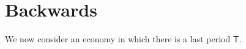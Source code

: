 \documentclass[../BufferStockTheory.tex]{subfiles}\usepackage{ApndxSteadyState}
\begin{document}
  

  \begin{comment}

    \begin{equation}\begin{gathered}\begin{aligned}
           & = \left(\frac{1}{2}\right)\left(\erf(\Top{\SetSub}_{\this}-\Bot{\SetSub}_{\this})-\erf(\Bot{\SetSub}_{\this}-\Bot{\SetSub}_{\this})\right)
    \end{aligned}\end{gathered}\end{equation}
  \end{comment}

  \begin{comment}
    Finally, for $a < b$ defining 
    \begin{equation}\begin{gathered}\begin{aligned}
      \mathfrak{C}(a,b) & \equiv  \CDF^{\tShk}(b)-\CDF^{\tShk}(a)
    \end{aligned}\end{gathered}\end{equation}

    so
    \begin{equation}\begin{gathered}\begin{aligned}
      \PTrns_{\this,\that} &= \int_{\Bot{\SetSub}_{\this}}^{\Top{\SetSub}_{\this}} \mathfrak{C}(\point-\underline{\point}_{\that},\point-\bar{\point}_{\that})d\CDF^{\point}
    \end{aligned}\end{gathered}\end{equation}
  \end{comment}

  \section{Backwards}

  \newcommand{\last}{\mathsf{T}}
  We now consider an economy in which there is a last period $\last$.
\end{document}
